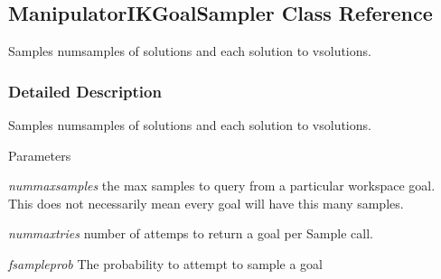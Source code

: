 \hypertarget{classOpenRAVE_1_1planningutils_1_1ManipulatorIKGoalSampler}{
\subsection{ManipulatorIKGoalSampler Class Reference}
\label{classOpenRAVE_1_1planningutils_1_1ManipulatorIKGoalSampler}
}


Samples numsamples of solutions and each solution to vsolutions.  




\subsubsection{Detailed Description}
Samples numsamples of solutions and each solution to vsolutions. 
\begin{DoxyParams}{Parameters}
\item[{\em nummaxsamples}]the max samples to query from a particular workspace goal. This does not necessarily mean every goal will have this many samples. \item[{\em nummaxtries}]number of attemps to return a goal per Sample call. \item[{\em fsampleprob}]The probability to attempt to sample a goal \end{DoxyParams}
